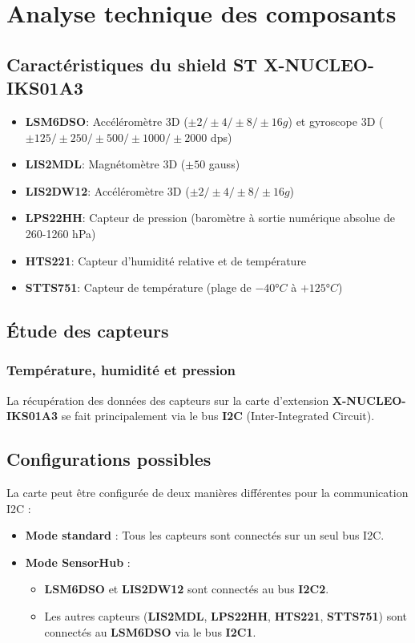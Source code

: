 \documentclass[12pt]{article}
\begin{document}
\section{Analyse technique des composants}
\subsection{Caractéristiques du shield ST X-NUCLEO-IKS01A3}
\begin{itemize}
    \item \textbf{LSM6DSO}: Accéléromètre 3D ($\pm2/\pm4/\pm8/\pm16g$) et gyroscope 3D ($\pm125/\pm250/\pm500/\pm1000/\pm2000$ dps)
    \item \textbf{LIS2MDL}: Magnétomètre 3D ($\pm50$ gauss)
    \item \textbf{LIS2DW12}: Accéléromètre 3D ($\pm2/\pm4/\pm8/\pm16g$)
    \item \textbf{LPS22HH}: Capteur de pression (baromètre à sortie numérique absolue de 260-1260 hPa)
    \item \textbf{HTS221}: Capteur d'humidité relative et de température
    \item \textbf{STTS751}: Capteur de température (plage de $-40°C$ à $+125°C$)
\end{itemize}

\subsection{Étude des capteurs}
\subsubsection{Température, humidité et pression}
La récupération des données des capteurs sur la carte d'extension \textbf{X-NUCLEO-IKS01A3} se fait principalement via le bus \textbf{I2C} (Inter-Integrated Circuit).

\subsection*{Configurations possibles}

La carte peut être configurée de deux manières différentes pour la communication I2C :
\begin{itemize}
    \item \textbf{Mode standard} : Tous les capteurs sont connectés sur un seul bus I2C.
    \item \textbf{Mode SensorHub} :
    \begin{itemize}
        \item \textbf{LSM6DSO} et \textbf{LIS2DW12} sont connectés au bus \textbf{I2C2}.
        \item Les autres capteurs (\textbf{LIS2MDL}, \textbf{LPS22HH}, \textbf{HTS221}, \textbf{STTS751}) sont connectés au \textbf{LSM6DSO} via le bus \textbf{I2C1}.
    \end{itemize}
\end{itemize}
\end{document}
